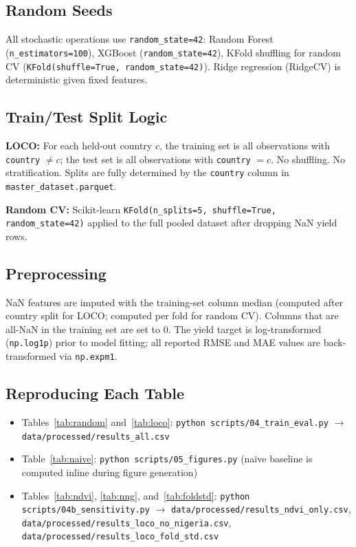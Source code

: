 \documentclass[journal]{IEEEtran}
\begin{document}
\subsection{Random Seeds}

All stochastic operations use \texttt{random\_state=42}:
Random Forest (\texttt{n\_estimators=100}),
XGBoost (\texttt{random\_state=42}),
KFold shuffling for random CV (\texttt{KFold(shuffle=True, random\_state=42)}).
Ridge regression (RidgeCV) is deterministic given fixed features.

\subsection{Train/Test Split Logic}

\textbf{LOCO:} For each held-out country $c$, the training set is all observations
with \texttt{country} $\neq c$; the test set is all observations with
\texttt{country} $= c$.
No shuffling. No stratification. Splits are fully determined by the
\texttt{country} column in \texttt{master\_dataset.parquet}.

\textbf{Random CV:} Scikit-learn \texttt{KFold(n\_splits=5, shuffle=True, random\_state=42)}
applied to the full pooled dataset after dropping NaN yield rows.

\subsection{Preprocessing}

NaN features are imputed with the training-set column median
(computed after country split for LOCO; computed per fold for random CV).
Columns that are all-NaN in the training set are set to 0.
The yield target is log-transformed (\texttt{np.log1p}) prior to model fitting;
all reported RMSE and MAE values are back-transformed via \texttt{np.expm1}.

\subsection{Reproducing Each Table}

\begin{itemize}
  \item Tables~\ref{tab:random} and~\ref{tab:loco}: \texttt{python scripts/04\_train\_eval.py}
        $\rightarrow$ \texttt{data/processed/results\_all.csv}
  \item Table~\ref{tab:naive}: \texttt{python scripts/05\_figures.py} (naive baseline
        is computed inline during figure generation)
  \item Tables~\ref{tab:ndvi}, \ref{tab:nng}, and~\ref{tab:foldstd}:
        \texttt{python scripts/04b\_sensitivity.py}
        $\rightarrow$ \texttt{data/processed/results\_ndvi\_only.csv},
        \texttt{data/processed/results\_loco\_no\_nigeria.csv},
        \texttt{data/processed/results\_loco\_fold\_std.csv}
\end{itemize}
\end{document}
